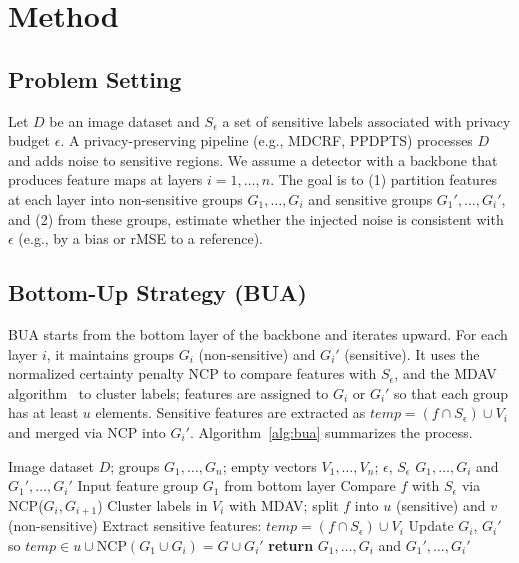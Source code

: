 \documentclass[journal]{IEEEtran}
\begin{document}
\section{Method}
\label{sec:method}

\subsection{Problem Setting}
\label{subsec:setting}

Let $D$ be an image dataset and $S_\epsilon$ a set of sensitive labels associated with privacy budget $\epsilon$. A privacy-preserving pipeline (e.g., MDCRF, PPDPTS) processes $D$ and adds noise to sensitive regions. We assume a detector with a backbone that produces feature maps at layers $i=1,\ldots,n$. The goal is to (1) partition features at each layer into non-sensitive groups $G_1,\ldots,G_i$ and sensitive groups $G_1',\ldots,G_i'$, and (2) from these groups, estimate whether the injected noise is consistent with $\epsilon$ (e.g., by a bias or rMSE to a reference).

\subsection{Bottom-Up Strategy (BUA)}
\label{subsec:bua}

BUA starts from the bottom layer of the backbone and iterates upward. For each layer $i$, it maintains groups $G_i$ (non-sensitive) and $G_i'$ (sensitive). It uses the normalized certainty penalty NCP to compare features with $S_\epsilon$, and the MDAV algorithm~\cite{soria2014enhancing} to cluster labels; features are assigned to $G_i$ or $G_i'$ so that each group has at least $u$ elements. Sensitive features are extracted as $\mathit{temp} = (f \cap S_\epsilon) \cup V_i$ and merged via NCP into $G_i'$. Algorithm~\ref{alg:bua} summarizes the process.

\begin{algorithm}[t]
\caption{Bottom-Up Strategy (BUA)}
\label{alg:bua}
\begin{algorithmic}[1]
\REQUIRE Image dataset $D$; groups $G_1,\ldots,G_n$; empty vectors $V_1,\ldots,V_n$; $\epsilon$, $S_\epsilon$
\ENSURE $G_1,\ldots,G_i$ and $G_1',\ldots,G_i'$
\STATE Input feature group $G_1$ from bottom layer
    \STATE Compare $f$ with $S_\epsilon$ via NCP($G_i,G_{i+1}$)
    \STATE Cluster labels in $V_i$ with MDAV; split $f$ into $u$ (sensitive) and $v$ (non-sensitive)
    \STATE Extract sensitive features: $\mathit{temp} = (f \cap S_\epsilon) \cup V_i$
    \STATE Update $G_i$, $G_i'$ so $\mathit{temp} \in u \cup \mathrm{NCP}(G_1 \cup G_i) = G \cup G_i'$
  \ENDFOR
\ENDFOR
\STATE \textbf{return} $G_1,\ldots,G_i$ and $G_1',\ldots,G_i'$
\end{algorithmic}
\end{algorithm}
\end{document}
